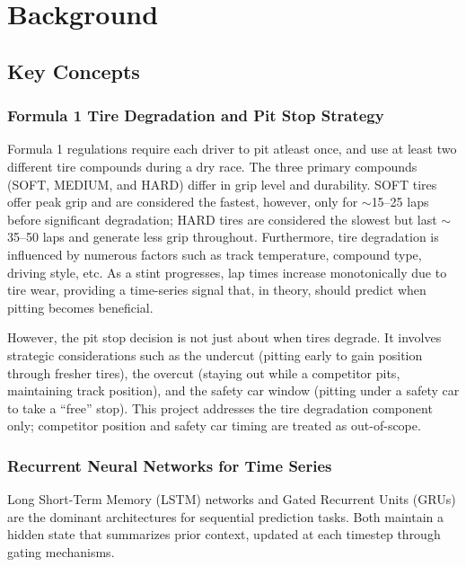\section{Background}\label{sec:background}

\subsection{Key Concepts}

\subsubsection{Formula 1 Tire Degradation and Pit Stop Strategy}

Formula 1 regulations require each driver to pit atleast once, and use at least two different tire compounds during a dry race. The three primary 
compounds (SOFT, MEDIUM, and HARD) differ in grip level and durability. SOFT tires offer peak grip and are considered the fastest, however, only
for $\sim$15--25 laps before 
significant degradation; HARD tires are considered the slowest but last $\sim$35--50 laps and generate less grip throughout. Furthermore, tire degradation is influenced by numerous factors such as track temperature, compound type, driving style, etc.
As a stint progresses, lap times increase monotonically due to tire wear, providing a time-series signal 
that, in theory, should predict when pitting becomes beneficial.

However, the pit stop decision is not just about when tires degrade. It involves strategic considerations such as the undercut 
(pitting early to gain position through fresher tires), the overcut (staying out while a competitor pits, maintaining track 
position), and the safety car window (pitting under a safety car to take a ``free'' stop). This project addresses the tire 
degradation component only; competitor position and safety car timing are treated as out-of-scope.

\subsubsection{Recurrent Neural Networks for Time Series}

Long Short-Term Memory (LSTM) networks \cite{hochreiter1997} and Gated Recurrent Units (GRUs) \cite{cho2014} are the dominant 
architectures for sequential prediction tasks. Both maintain a hidden state that summarizes prior context, updated at each
 timestep through gating mechanisms.

